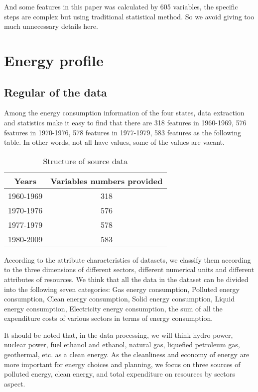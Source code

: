 \documentclass[a4paper]{article}
\begin{document}
And some features in this paper was calculated by 605 variables, the specific steps are complex but using traditional statistical method. So we avoid giving too much unnecessary details here.

\section{Energy profile}

\subsection{Regular of the data}

Among the energy consumption information of the four states, data extraction and statistics make it easy to find that there are 318 features in 1960-1969, 576 features in 1970-1976, 578 features in 1977-1979, 583 features as the following table. In other words, not all have values, some of the values are vacant.

\begin{table}[!htbp]
\centering
\begin{tabular}{cc}
\toprule
Years & Variables numbers provided\\
\midrule
1960-1969 & 318\\
1970-1976 & 576\\
1977-1979 & 578\\
1980-2009 & 583\\
\bottomrule
\end{tabular}
\caption{Structure of source data}\label{tab:aStrangeTable}
\end{table}

According to the attribute characteristics of datasets, we classify them according to the three dimensions of different sectors, different numerical units and different attributes of resources. We think that all the data in the dataset can be divided into the following seven categories: Gas energy consumption, Polluted energy consumption, Clean energy consumption, Solid energy consumption, Liquid energy consumption, Electricity energy consumption, the sum of all the expenditure costs of various sectors in terms of energy consumption.

It should be noted that, in the data processing, we will think hydro power, nuclear power, fuel ethanol and ethanol, natural gas, liquefied petroleum gas, geothermal, etc. as a clean energy. As the cleanliness and economy of energy are more important for energy choices and planning, we focus on three sources of polluted energy, clean energy, and total expenditure on resources by sectors aspect.
\end{document}
